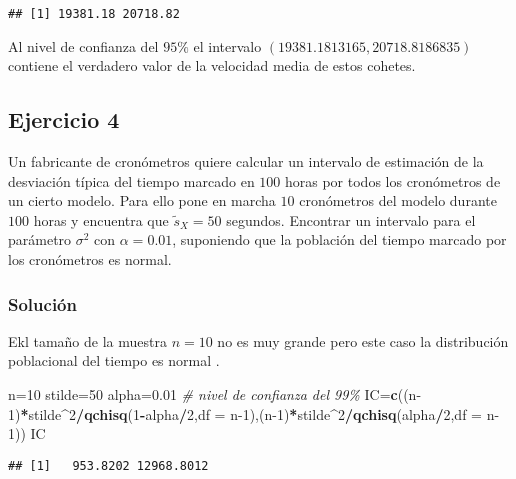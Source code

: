 \documentclass[
]{article}
\newenvironment{Shaded}{\begin{snugshade}}{\end{snugshade}}
\newcommand{\CommentTok}[1]{\textcolor[rgb]{0.56,0.35,0.01}{\textit{#1}}}
\newcommand{\DataTypeTok}[1]{\textcolor[rgb]{0.13,0.29,0.53}{#1}}
\newcommand{\DecValTok}[1]{\textcolor[rgb]{0.00,0.00,0.81}{#1}}
\newcommand{\FloatTok}[1]{\textcolor[rgb]{0.00,0.00,0.81}{#1}}
\newcommand{\KeywordTok}[1]{\textcolor[rgb]{0.13,0.29,0.53}{\textbf{#1}}}
\newcommand{\NormalTok}[1]{#1}
\newcommand{\OperatorTok}[1]{\textcolor[rgb]{0.81,0.36,0.00}{\textbf{#1}}}
\begin{document}
\begin{verbatim}
## [1] 19381.18 20718.82
\end{verbatim}

Al nivel de confianza del \(95\%\) el intervalo
\((19381.1813165, 20718.8186835)\) contiene el verdadero valor de la
velocidad media de estos cohetes.

\hypertarget{ejercicio-4}{%
\subsection{Ejercicio 4}\label{ejercicio-4}}

Un fabricante de cronómetros quiere calcular un intervalo de estimación
de la desviación típica del tiempo marcado en \(100\) horas por todos
los cronómetros de un cierto modelo. Para ello pone en marcha \(10\)
cronómetros del modelo durante \(100\) horas y encuentra que
\(\tilde{s}_{X}=50\) segundos. Encontrar un intervalo para el parámetro
\(\sigma^2\) con \(\alpha=0.01\), suponiendo que la población del tiempo
marcado por los cronómetros es normal.

\hypertarget{soluciuxf3n-3}{%
\subsubsection{Solución}\label{soluciuxf3n-3}}

Ekl tamaño de la muestra \(n=10\) no es muy grande pero este caso la
distribución poblacional del tiempo es normal .

\begin{Shaded}
\begin{Highlighting}[]
\NormalTok{n=}\DecValTok{10}
\NormalTok{stilde=}\DecValTok{50}
\NormalTok{alpha=}\FloatTok{0.01} \CommentTok{\# nivel de confianza del 99\% }
\NormalTok{IC=}\KeywordTok{c}\NormalTok{((n}\DecValTok{{-}1}\NormalTok{)}\OperatorTok{*}\NormalTok{stilde}\OperatorTok{\^{}}\DecValTok{2}\OperatorTok{/}\KeywordTok{qchisq}\NormalTok{(}\DecValTok{1}\OperatorTok{{-}}\NormalTok{alpha}\OperatorTok{/}\DecValTok{2}\NormalTok{,}\DataTypeTok{df =}\NormalTok{ n}\DecValTok{{-}1}\NormalTok{),(n}\DecValTok{{-}1}\NormalTok{)}\OperatorTok{*}\NormalTok{stilde}\OperatorTok{\^{}}\DecValTok{2}\OperatorTok{/}\KeywordTok{qchisq}\NormalTok{(alpha}\OperatorTok{/}\DecValTok{2}\NormalTok{,}\DataTypeTok{df =}\NormalTok{ n}\DecValTok{{-}1}\NormalTok{))}
\NormalTok{IC}
\end{Highlighting}
\end{Shaded}

\begin{verbatim}
## [1]   953.8202 12968.8012
\end{verbatim}
\end{document}
